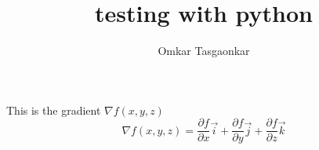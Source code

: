 \documentclass{article}
\title{testing with python}
\author{Omkar Tasgaonkar}
\begin{document}
\maketitle
\tableofcontents
\listoffigures
\pagebreak
This is the gradient $\nabla$$f(x,y,z)$\\


\begin{equation}
\nabla f(x, y, z) = \frac{\partial f}{\partial x}\vec{i}+\frac{\partial f}{\partial y}\vec{j}+\frac{\partial f}{\partial z}\vec{k}
\end{equation}
\end{document}
